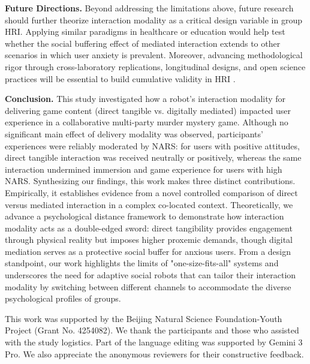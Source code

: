 \documentclass[sigconf,screen]{acmart-tagged}
\begin{document}
\noindent \textbf{Future Directions.} Beyond addressing the limitations above, future research should further theorize interaction modality as a critical design variable in group HRI. Applying similar paradigms in healthcare or education would help test whether the social buffering effect of mediated interaction extends to other scenarios in which user anxiety is prevalent. Moreover, advancing methodological rigor through cross-laboratory replications, longitudinal designs, and open science practices will be essential to build cumulative validity in HRI \cite{strait2020three, gunes2022reproducibility, irfan2025lifelong, leichtmann2022crisis}.

\noindent \textbf{Conclusion.} This study investigated how a robot's interaction modality for delivering game content (direct tangible vs. digitally mediated) impacted user experience in a collaborative multi-party murder mystery game. Although no significant main effect of delivery modality was observed, participants' experiences were reliably moderated by NARS: for users with positive attitudes, direct tangible interaction was received neutrally or positively, whereas the same interaction undermined immersion and game experience for users with high NARS. Synthesizing our findings, this work makes three distinct contributions. Empirically, it establishes evidence from a novel controlled comparison of direct versus mediated interaction in a complex co-located context. Theoretically, we advance a psychological distance framework to demonstrate how interaction modality acts as a double-edged sword: direct tangibility provides engagement through physical reality but imposes higher proxemic demands, though digital mediation serves as a protective social buffer for anxious users. From a design standpoint, our work highlights the limits of "one-size-fits-all" systems and underscores the need for adaptive social robots that can tailor their interaction modality by switching between different channels to accommodate the diverse psychological profiles of groups.

\vspace{-12pt}

\begin{acks}
This work was supported by the Beijing Natural Science Foundation-Youth Project (Grant No. 4254082). We thank the participants and those who assisted with the study logistics. Part of the language editing was supported by Gemini 3 Pro. We also appreciate the anonymous reviewers for their constructive feedback.
\end{acks}

\balance




\end{document}
